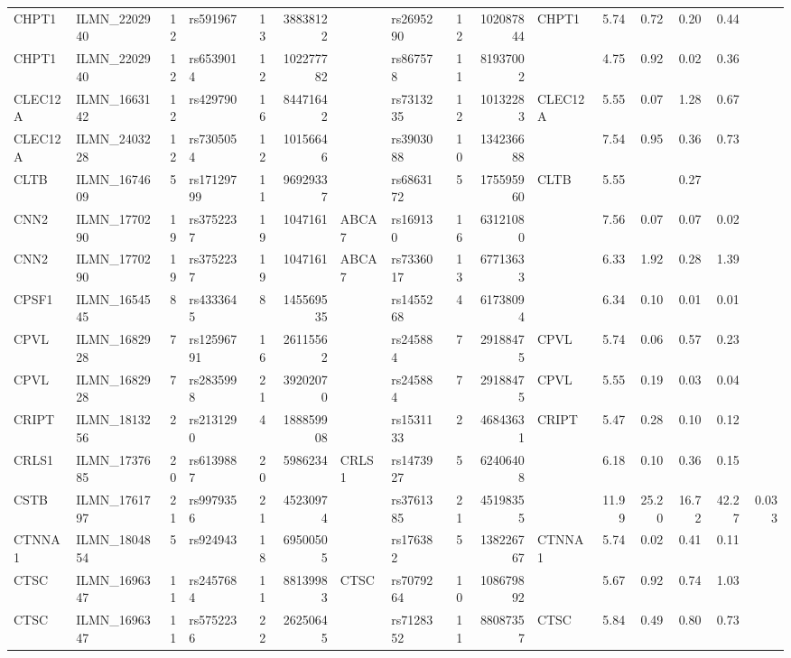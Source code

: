 \documentclass{article}
\begin{document}
\begin{landscape}
{\begin{ThreePartTable}
\begin{longtable}{|llr|lrrl|lrrl|rrrr|r|}
  CHPT1 & ILMN\_2202940 & 12 & rs591967 & 13 & 38838122 &  & rs2695290 & 12 & 102087844 & CHPT1 & 5.74 & 0.72 & 0.20 & 0.44 &  \\
  CHPT1 & ILMN\_2202940 & 12 & rs6539014 & 12 & 102277782 &  & rs867578 & 11 & 81937002 &  & 4.75 & 0.92 & 0.02 & 0.36 &  \\
  CLEC12A & ILMN\_1663142 & 12 & rs429790 & 16 & 84471642 &  & rs7313235 & 12 & 10132283 & CLEC12A & 5.55 & 0.07 & 1.28 & 0.67 &  \\
  CLEC12A & ILMN\_2403228 & 12 & rs7305054 & 12 & 10156646 &  & rs3903088 & 10 & 134236688 &  & 7.54 & 0.95 & 0.36 & 0.73 &  \\
  CLTB & ILMN\_1674609 & 5 & rs17129799 & 11 & 96929337 &  & rs6863172 & 5 & 175595960 & CLTB & 5.55 &  & 0.27 &  &  \\
  CNN2 & ILMN\_1770290 & 19 & rs3752237 & 19 & 1047161 & ABCA7 & rs169130 & 16 & 63121080 &  & 7.56 & 0.07 & 0.07 & 0.02 &  \\
  CNN2 & ILMN\_1770290 & 19 & rs3752237 & 19 & 1047161 & ABCA7 & rs7336017 & 13 & 67713633 &  & 6.33 & 1.92 & 0.28 & 1.39 &  \\
  CPSF1 & ILMN\_1654545 & 8 & rs4333645 & 8 & 145569535 &  & rs1455268 & 4 & 61738094 &  & 6.34 & 0.10 & 0.01 & 0.01 &  \\
  CPVL & ILMN\_1682928 & 7 & rs12596791 & 16 & 26115562 &  & rs245884 & 7 & 29188475 & CPVL & 5.74 & 0.06 & 0.57 & 0.23 &  \\
  CPVL & ILMN\_1682928 & 7 & rs2835998 & 21 & 39202070 &  & rs245884 & 7 & 29188475 & CPVL & 5.55 & 0.19 & 0.03 & 0.04 &  \\
  CRIPT & ILMN\_1813256 & 2 & rs2131290 & 4 & 188859908 &  & rs1531133 & 2 & 46843631 & CRIPT & 5.47 & 0.28 & 0.10 & 0.12 &  \\
  CRLS1 & ILMN\_1737685 & 20 & rs6139887 & 20 & 5986234 & CRLS1 & rs1473927 & 5 & 62406408 &  & 6.18 & 0.10 & 0.36 & 0.15 &  \\
  CSTB & ILMN\_1761797 & 21 & rs9979356 & 21 & 45230974 &  & rs3761385 & 21 & 45198355 &  & 11.99 & 25.20 & 16.72 & 42.27 & 0.033 \\
  CTNNA1 & ILMN\_1804854 & 5 & rs924943 & 18 & 69500505 &  & rs176382 & 5 & 138226767 & CTNNA1 & 5.74 & 0.02 & 0.41 & 0.11 &  \\
  CTSC & ILMN\_1696347 & 11 & rs2457684 & 11 & 88139983 & CTSC & rs7079264 & 10 & 108679892 &  & 5.67 & 0.92 & 0.74 & 1.03 &  \\
  CTSC & ILMN\_1696347 & 11 & rs5752236 & 22 & 26250645 &  & rs7128352 & 11 & 88087357 & CTSC & 5.84 & 0.49 & 0.80 & 0.73 &  \\

\end{longtable}
\end{ThreePartTable}}
\end{landscape}
\end{document}
